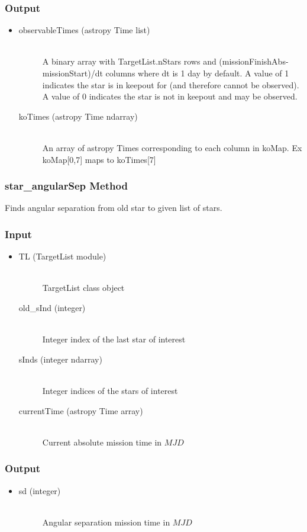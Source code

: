 \documentclass[cleanfoot]{asme2ej}
\begin{document}
\subsubsection*{Output}
\begin{itemize}
\item 
\begin{description}
    \item[observableTimes (astropy Time list)] \hfill \\ A binary array with TargetList.nStars rows and (missionFinishAbs-missionStart)/dt columns where dt is 1 day by default. A value of 1 indicates the star is in keepout for (and therefore cannot be observed). A value of 0 indicates the star is not in keepout and may be observed.
    \item[koTimes (astropy Time ndarray)] \hfill \\ An array of astropy Times corresponding to each column in koMap. Ex koMap[0,7] maps to koTimes[7] 
\end{description}
\end{itemize}

\subsubsection{star\_angularSep Method} \label{}
Finds angular separation from old star to given list of stars.
\subsubsection*{Input}
\begin{itemize}
\item
\begin{description}
    \item[TL (TargetList module)] \hfill \\ TargetList class object
    \item[old\_sInd (integer)] \hfill \\ Integer index of the last star of interest
    \item[sInds (integer ndarray)] \hfill \\ Integer indices of the stars of interest
    \item[currentTime (astropy Time array)] \hfill \\ Current absolute mission time in $ MJD $
\end{description}
\end{itemize}
\subsubsection*{Output}
\begin{itemize}
\item
\begin{description}
    \item[sd (integer)] \hfill \\ Angular separation mission time in $ MJD $
\end{description}
\end{itemize}
\end{document}
